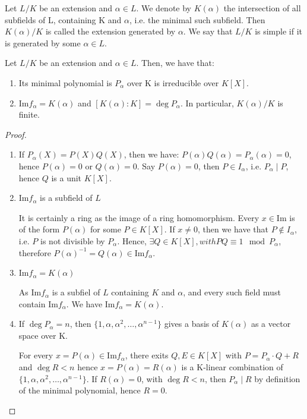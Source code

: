 \begin{definition} \label{def:6}
  Let $L/K$ be an extension and $\alpha \in L$. We denote by $K(\alpha)$ the intersection of all subfields of L, containing K and $\alpha$, i.e. the minimal such subfield. Then $K(\alpha)/K$ is called the extension generated by $\alpha$. We say that $L/K$ is simple if it is generated by some $\alpha \in L$.
\end{definition}

\begin{proposition} \label{prop:7}
  Let $L/K$ be an extension and $\alpha \in L$. Then, we have that:
  \begin{enumerate}
  \item Its minimal polynomial is $P_\alpha$ over K is irreducible over $K[X]$.
  \item $\text{Im} f_\alpha = K(\alpha)$ and $[K(\alpha) : K] = \deg P_\alpha$. In particular, $K(\alpha)/K$ is finite.
  \end{enumerate}
\end{proposition}

\begin{proof} 
  \begin{enumerate}
  \item If $P_\alpha(X) = P(X)Q(X)$, then we have: $P(\alpha)Q(\alpha) = P_\alpha(\alpha) = 0$, hence $P(\alpha) = 0$ or $Q(\alpha) = 0$. Say $P(\alpha) = 0$, then $P \in I_\alpha$, i.e. $P_\alpha \mid P$, hence $Q$ is a unit $K[X]$.

  \item $\text{Im} f_\alpha$ is a subfield of $L$ 

It is certainly a ring as the image of a ring homomorphism. Every $x \in \text{Im}$ is of the form $P(\alpha)$ for some $P \in K[X]$. If $x \neq 0$, then we have that $P \not\in I_\alpha$, i.e. $P$ is not divisible by $P_\alpha$. Hence, $\exists Q \in K[X], with PQ \equiv 1 \mod{P_\alpha}$, therefore $P(\alpha)^{-1} = Q(\alpha) \in \text{Im} f_\alpha$.

  \item $\text{Im} f_\alpha = K(\alpha)$

As $\text{Im} f_\alpha$ is a subfiel of $L$ containing $K$ and $\alpha$, and every such field must contain $\text{Im} f_\alpha$. We have $\text{Im} f_\alpha = K(\alpha)$.

  \item If $\deg P_\alpha = n$, then $\{1, \alpha, \alpha^2, \ldots, \alpha^{n-1}\}$ gives a basis of $K(\alpha)$ as a vector space over K.

For every $x = P(\alpha) \in \text{Im} f_\alpha$, there exits $Q, E \in K[X]$ with $P = P_\alpha\cdot{}Q + R$ and $\deg R < n$ hence $x = P(\alpha) = R(\alpha)$ is a K-linear combination of $\{1, \alpha, \alpha^2, \ldots, \alpha^{n-1}\}$. If $R(\alpha) = 0$, with $\deg R < n$, then $P_\alpha \mid R$ by definition of the minimal polynomial, hence $R = 0$.
  \end{enumerate}
\end{proof}

